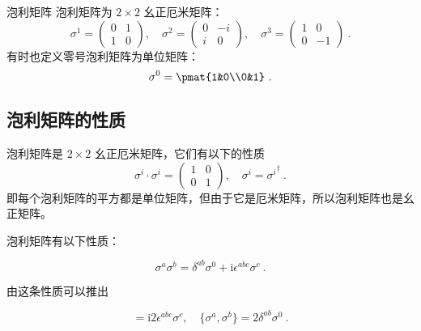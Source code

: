 \begin{definition}{泡利矩阵}\label{def_pauliM_1}
泡利矩阵为 $2\times 2$ 幺正厄米矩阵：
\begin{equation}
\sigma^1 = \begin{pmatrix}
0 & 1\\
1 & 0
\end{pmatrix},\quad 
\sigma^2 = \begin{pmatrix}
0 & -i\\
i & 0
\end{pmatrix},\quad 
\sigma^3 = 
\begin{pmatrix}
1 & 0\\
0 & -1
\end{pmatrix}
~.
\end{equation}
有时也定义零号泡利矩阵为单位矩阵：
\begin{equation}
\sigma^0 = \pmat{1&0\\0&1}~.
\end{equation}

\end{definition}

\subsection{泡利矩阵的性质}
泡利矩阵是 $2\times 2$ 幺正厄米矩阵，它们有以下的性质
\begin{equation}
\sigma^i\cdot \sigma^i = \begin{pmatrix}1&0\\0&1\end{pmatrix},\quad \sigma^i = {\sigma^i}^\dagger~.
\end{equation}
即每个泡利矩阵的平方都是单位矩阵，但由于它是厄米矩阵，所以泡利矩阵也是幺正矩阵。

泡利矩阵有以下性质：
\begin{theorem}{}
\begin{equation}\label{eq_pauliM_1}
\sigma^a\sigma^b = \delta^{ab}\sigma^0 + \mathrm{i}\epsilon^{abc}\sigma^c~.
\end{equation}
\end{theorem}
由这条性质可以推出
\begin{lemma}{}
\begin{equation}
[\sigma^a,\sigma^b] = \mathrm{i}2\epsilon^{abc}\sigma^c,\quad \{\sigma^a,\sigma^b\}=2\delta^{ab}\sigma^0~.
\end{equation}

\end{lemma}
